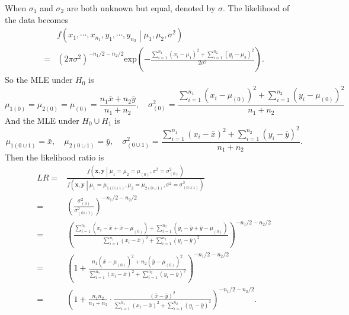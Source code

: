 \documentclass[a4paper,12pt]{article}
\begin{document}
When $\sigma_1$ and $\sigma_2$ are both unknown but equal, denoted by $\sigma$. The likelihood of the data becomes
\[
  \begin{aligned}
    & f\left(
      x_1, \cdots, x_{n_1}, y_1, \cdots, y_{n_2}
      \middle|
      \mu_1, \mu_2, \sigma^2
      \right)    \\
    = & \left(
        2\pi\sigma^2
        \right)^{-n_1 / 2 - n_2 / 2}
        \mathrm{exp}\left(
        -\frac{
        \sum\limits_{i = 1}^{n_1}\left(x_i - \mu_1\right)^2
        + \sum\limits_{i = 1}^{n_2}\left(y_i - \mu_2\right)^2
        }{
        2\sigma^2
        }
        \right)
        .
  \end{aligned}
\]
So the MLE under $H_0$ is
\[
  \mu_{1\left(0\right)} = \mu_{2\left(0\right)} = \mu_{\left(0\right)} = \frac{n_1\bar{x} + n_2\bar{y}}{n_1 + n_2}
  ,\quad
  \sigma^2_{\left(0\right)} = \frac{
    \sum\limits_{i = 1}^{n_1}\left(x_i - \mu_{\left(0\right)}\right)^2
    + \sum\limits_{i = 1}^{n_2}\left(y_i  - \mu_{\left(0\right)}\right)^2
  }{
    n_1 + n_2
  }
\]
And the MLE under $H_0\cup H_1$ is
\[
  \mu_{1\left(0\cup1\right)} = \bar{x},\quad \mu_{2\left(0\cup1\right)} = \bar{y}
  ,\quad
  \sigma^2_{\left(0\cup1\right)} =
  \frac{
    \sum\limits_{i = 1}^{n_1}\left(x_i - \bar{x}\right)^2
    + \sum\limits_{i = 1}^{n_2}\left(y_i - \bar{y}\right)^2
  }{
    n_1 + n_2
  }
  .
\]
Then the likelihood ratio is
\[
  \begin{aligned}
    LR =& \frac{
          f\left(\bm{x}, \bm{y}\middle|\mu_1 = \mu_2 = \mu_{\left(0\right)}, \sigma^2 = \sigma_{\left(0\right)}^2\right)
          }{
          f\left(\bm{x}, \bm{y}\middle|
          \mu_1 = \mu_{1\left(0\cup1\right)},
          \mu_2 = \mu_{2\left(0\cup1\right)},
          \sigma^2 = \sigma_{\left(0\cup1\right)}^2\right)
          }    \\
    =& \left(
       \frac{\sigma_{\left(0\right)}^2}{\sigma_{\left(0\cup1\right)}^2}
       \right)^{-n_1 / 2 - n_2 / 2}    \\
    =& \left(
       \frac{
       \sum\limits_{i = 1}^{n_1}\left(x_i - \bar{x} + \bar{x} - \mu_{\left(0\right)}\right)
       + \sum\limits_{i = 1}^{n_2}\left(y_i - \bar{y} + \bar{y} - \mu_{\left(0\right)}\right)
       }{
       \sum\limits_{i = 1}^{n_1}\left(x_i - \bar{x}\right)^2
       + \sum\limits_{i = 1}^{n_2}\left(y_i - \bar{y}\right)^2
       }
       \right)^{-n_1 / 2 - n_2 / 2}    \\
    =& \left(
       1 + \frac{
       n_1\left(\bar{x} - \mu_{\left(0\right)}\right)^2
       + n_2\left(\bar{y} - \mu_{\left(0\right)}\right)^2
       }{
       \sum\limits_{i = 1}^{n_1}\left(x_i - \bar{x}\right)^2
       + \sum\limits_{i = 1}^{n_2}\left(y_i - \bar{y}\right)^2
       }
       \right)^{-n_1 / 2 - n_2 / 2}    \\
    =& \left(
       1 + \frac{n_1n_2}{n_1 + n_2}
       \cdot
       \frac{\left(\bar{x} - \bar{y}\right)^2}{
       \sum\limits_{i = 1}^{n_1}\left(x_i - \bar{x}\right)^2
       + \sum\limits_{i = 1}^{n_2}\left(y_i - \bar{y}\right)^2       
       }
       \right)^{-n_1 / 2 - n_2 / 2}
       .
  \end{aligned}
\]
\end{document}
